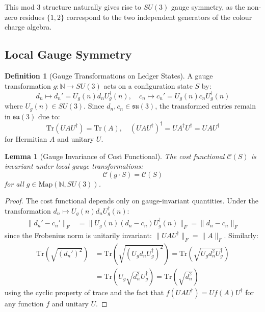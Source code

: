 \documentclass[11pt]{article}
\numberwithin{equation}{section}
\newtheorem{lemma}[theorem]{Lemma}
\theoremstyle{definition}
\newtheorem{definition}[theorem]{Definition}
\theoremstyle{remark}
\begin{document}
This mod 3 structure naturally gives rise to $SU(3)$ gauge symmetry, as the non-zero residues $\{1, 2\}$ correspond to the two independent generators of the colour charge algebra.

\subsection{Local Gauge Symmetry}

\begin{definition}[Gauge Transformations on Ledger States]
A gauge transformation $g: \mathbb{N} \to SU(3)$ acts on a configuration state $S$ by:
\begin{equation}
d_n \mapsto d_n' = U_g(n) d_n U_g^\dagger(n), \quad c_n \mapsto c_n' = U_g(n) c_n U_g^\dagger(n)
\end{equation}
where $U_g(n) \in SU(3)$. Since $d_n, c_n \in \mathfrak{su}(3)$, the transformed entries remain in $\mathfrak{su}(3)$ due to:
\begin{equation}
\text{Tr}(U A U^\dagger) = \text{Tr}(A), \quad (U A U^\dagger)^\dagger = U A^\dagger U^\dagger = U A U^\dagger
\end{equation}
for Hermitian $A$ and unitary $U$.
\end{definition}

\begin{lemma}[Gauge Invariance of Cost Functional]
The cost functional $\mathcal{C}(S)$ is invariant under local gauge transformations:
\begin{equation}
\mathcal{C}(g \cdot S) = \mathcal{C}(S)
\end{equation}
for all $g \in \text{Map}(\mathbb{N}, SU(3))$.
\end{lemma}

\begin{proof}
The cost functional depends only on gauge-invariant quantities. Under the transformation $d_n \mapsto U_g(n) d_n U_g^\dagger(n)$:
\begin{align}
\|d_n' - c_n'\|_F &= \|U_g(n)(d_n - c_n)U_g^\dagger(n)\|_F = \|d_n - c_n\|_F
\end{align}
since the Frobenius norm is unitarily invariant: $\|UAU^\dagger\|_F = \|A\|_F$. Similarly:
\begin{align}
\text{Tr}(\sqrt{(d_n')^2}) &= \text{Tr}(\sqrt{(U_g d_n U_g^\dagger)^2}) = \text{Tr}(\sqrt{U_g d_n^2 U_g^\dagger}) \\
&= \text{Tr}(U_g \sqrt{d_n^2} U_g^\dagger) = \text{Tr}(\sqrt{d_n^2})
\end{align}
using the cyclic property of trace and the fact that $f(UAU^\dagger) = Uf(A)U^\dagger$ for any function $f$ and unitary $U$.
\end{proof}
\end{document}
